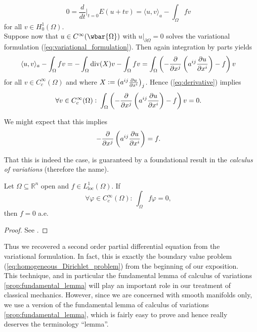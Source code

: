 \begin{equation}
	\label{eq:derivative}
	0 = \frac{d}{dt}\bigg\vert_{t = 0} E(u + tv) = \langle u, v \rangle_a - \int_\Omega f v
\end{equation}
\noindent for all $v \in H^1_0(\Omega)$.\\
Suppose now that $u \in C^\infty(\wbar{\Omega})$ with $u\vert_{\partial \Omega} = 0$ solves the variational formulation (\ref{eq:variational_formulation}). Then again integration by parts yields
\begin{equation*}
	\langle u, v \rangle_a - \int_\Omega f v = -\int_\Omega \mathrm{div}(X) v - \int_\Omega fv = \int_\Omega \del[3]{-\frac{\partial}{\partial x^j}\del[3]{a^{ij}\frac{\partial u}{\partial x^i}} - f} v
\end{equation*}
\noindent for all $v \in C^\infty_c(\Omega)$ and where $X := \del[1]{a^{ij}\frac{\partial u}{\partial x^i}}_j$. Hence (\ref{eq:derivative}) implies 
\begin{equation*}
	\forall v \in C^\infty_c(\Omega): \> \int_\Omega \del[3]{-\frac{\partial}{\partial x^j}\del[3]{a^{ij}\frac{\partial u}{\partial x^i}} - f} v = 0.
\end{equation*}

We might expect that this implies 
\begin{equation*}
	-\frac{\partial}{\partial x^j}\del[3]{a^{ij}\frac{\partial u}{\partial x^i}} = f.
\end{equation*}

That this is indeed the case, is guaranteed by a foundational result in the \emph{calculus of variations} (therefore the name).

\begin{proposition}
	\label{prop:fundamental_lemma}
	Let $\Omega \subseteq \mathbb{R}^n$ open and $f \in L^1_{\mathrm{loc}}(\Omega)$. If
	\begin{equation*}
		\forall \varphi \in C^\infty_c(\Omega): \> \int_\Omega f\varphi = 0,
	\end{equation*}
	\noindent then $f = 0$ a.e.
\end{proposition}

\begin{proof}
	See \cite[40]{struwe:fa:2014}.
\end{proof}

Thus we recovered a second order partial differential equation from the variational formulation. In fact, this is exactly the boundary value problem (\ref{eq:homogeneous_Dirichlet_problem}) from the beginning of our exposition. This technique, and in particular the fundamental lemma of calculus of variations \ref{prop:fundamental_lemma} will play an important role in our treatment of classical mechanics. However, since we are concerned with smooth manifolds only, we use a version of the fundamental lemma of calculus of variations \ref{prop:fundamental_lemma}, which is fairly easy to prove and hence really deserves the terminology ``lemma''.


